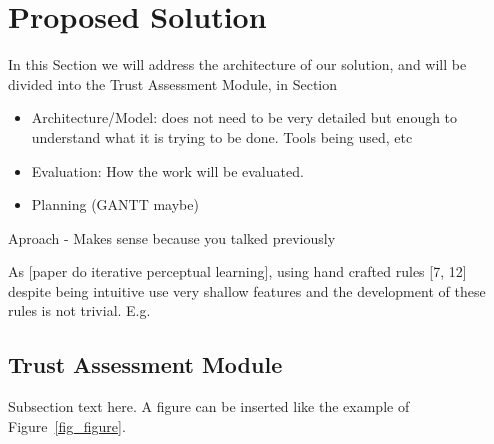 \section{Proposed Solution}
\label{sec:Solution}
In this Section we will address the architecture of our solution, and will be divided into the Trust Assessment Module, in Section \


\begin{itemize}
	\item Architecture/Model: does not need to be very detailed but enough to understand what it is trying to be done. Tools being used, etc
	\item Evaluation: How the work will be evaluated.	
	\item Planning (GANTT maybe)	
\end{itemize}Aproach - Makes sense because you talked previously


As [paper do iterative perceptual learning], using hand crafted rules [7, 12] despite being intuitive use very shallow features and the development of these rules is not trivial.
E.g.

\subsection{Trust Assessment Module}
Subsection text here.
A figure can be inserted like the example of Figure~\ref{fig_figure}.

